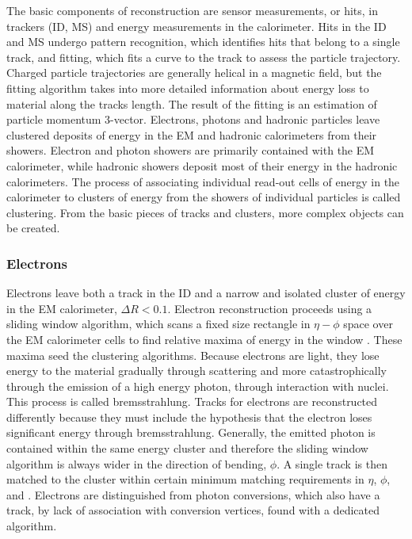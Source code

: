 The basic components of reconstruction are sensor measurements, or hits, in trackers (ID, MS) and energy measurements in the calorimeter. Hits in the ID and MS undergo pattern recognition, which identifies hits that belong to a single track, and fitting, which fits a curve to the track to assess the particle trajectory. Charged particle trajectories are generally helical in a magnetic field, but the fitting algorithm takes into more detailed information about energy loss to material along the tracks length. The result of the fitting is an estimation of particle momentum 3-vector. Electrons, photons and hadronic particles leave clustered deposits of energy in the EM and hadronic calorimeters from their showers. Electron and photon showers are primarily contained with the EM calorimeter, while hadronic showers deposit most of their energy in the hadronic calorimeters. The process of associating individual read-out cells of energy in the calorimeter to clusters of energy from the showers of individual particles is called clustering. From the basic pieces of tracks and clusters, more complex objects can be created. 

\subsubsection{Electrons}

Electrons leave both a track in the ID and a narrow and isolated cluster of energy in the EM calorimeter, $\Delta R < 0.1$. Electron reconstruction proceeds using a sliding window algorithm, which scans a fixed size rectangle in $\eta-\phi$ space over the EM calorimeter cells to find relative maxima of energy in the window \cite{ATLAS-CONF-2014-032}. These maxima seed the clustering algorithms. Because electrons are light, they lose energy to the material gradually through scattering and more catastrophically through the emission of a high energy photon, through interaction with nuclei. This process is called bremsstrahlung. Tracks for electrons are reconstructed differently because they must include the hypothesis that the electron loses significant energy through bremsstrahlung. Generally, the emitted photon is contained within the same energy cluster and therefore the sliding window algorithm is always wider in the direction of bending, $\phi$. A single track is then matched to the cluster within certain minimum matching requirements in $\eta$, $\phi$, and \pt. Electrons are distinguished from photon conversions, which also have a track, by lack of association with conversion vertices, found with a dedicated algorithm.

